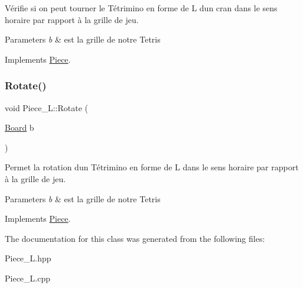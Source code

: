 Vérifie si on peut tourner le Tétrimino en forme de L d\textquotesingle{}un cran dans le sens horaire par rapport à la grille de jeu. 


\begin{DoxyParams}{Parameters}
{\em b} & est la grille de notre Tetris \\
\hline
\end{DoxyParams}


Implements \hyperlink{classPiece_a56cdf7f4234fe848a3e203b693b7a862}{Piece}.

\mbox{\label{classPiece__L_aa865e9d2c6c468ac2921d6adb88f4d1b}} 
\subsubsection{\texorpdfstring{Rotate()}{Rotate()}}
{\footnotesize\ttfamily void Piece\+\_\+\+L\+::\+Rotate (\begin{DoxyParamCaption}\item[{\hyperlink{classBoard}{Board}}]{b }\end{DoxyParamCaption})\hspace{0.3cm}{\ttfamily [virtual]}}



Permet la rotation d\textquotesingle{}un Tétrimino en forme de L dans le sens horaire par rapport à la grille de jeu. 


\begin{DoxyParams}{Parameters}
{\em b} & est la grille de notre Tetris \\
\hline
\end{DoxyParams}


Implements \hyperlink{classPiece_a078f3cc6281cb8f60af3ae2266c651ba}{Piece}.



The documentation for this class was generated from the following files\+:\begin{DoxyCompactItemize}
\item 
Piece\+\_\+\+L.\+hpp\item 
Piece\+\_\+\+L.\+cpp\end{DoxyCompactItemize}
